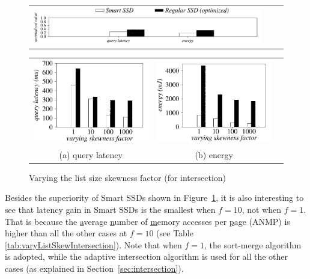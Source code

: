 \begin{figure}[tbp]
  \centering
    \begin{tabular}{ccc}
 \includegraphics[width=0.52\columnwidth]{figures/banner2.pdf}%
\end{tabular}
\vspace{-0.1cm}
\renewcommand{\tabcolsep}{0.1mm}


  \begin{tabular}{ccc}
 \includegraphics[width=0.5\columnwidth]{figures/Intersection-time-VaryListSkew2-eps-converted-to.pdf}&
  \includegraphics[width=0.5\columnwidth]{figures/Intersection-energy-VaryListSkew2-eps-converted-to.pdf}\\
  (a) query latency & (b) energy\\
\end{tabular}

  \caption{Varying the list size skewness factor (for intersection)}
  \label{fig:varyListSkewIntersection}
 \end{figure}

Besides the superiority of Smart SSDs shown in Figure~\ref{fig:varyListSkewIntersection}, it is also interesting to see that latency gain in Smart SSDs is the smallest when $f=10$, not when $f=1$. That is because the \underline{a}verage \underline{n}umber of \underline{m}emory accesses per \underline{p}age (ANMP) is higher than all the other cases at $f=10$ (see Table \ref{tab:varyListSkewIntersection}). Note that when $f=1$, the sort-merge algorithm is adopted, while the adaptive intersection algorithm is used for all the other cases (as explained in Section~\ref{sec:intersection}).


